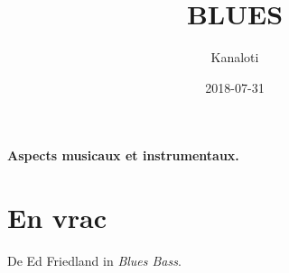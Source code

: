\documentclass[a4paper]{article}
\title{BLUES}
\author{Kanaloti}
\date{2018-07-31}
\begin{document}
\clearpage\setcounter{page}{1}\pagestyle{LeftPage}
\thispagestyle{RightPage}
{\sffamily\bfseries {\maketitle}}
{\centering\sffamily\bfseries
Aspects musicaux et instrumentaux.
\par}




\setcounter{tocdepth}{10}
\renewcommand\contentsname{Table des mati\`eres}
\tableofcontents


 
\clearpage
\section{En vrac}
De Ed Friedland in \emph{Blues Bass}.
\end{document}
